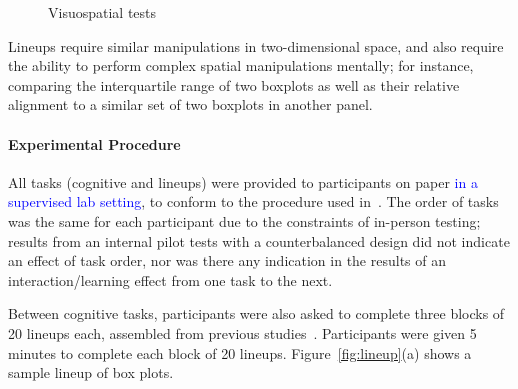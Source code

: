 \documentclass[journal]{vgtc}\usepackage[]{graphicx}\usepackage[]{color}
\newcommand{\newtext}[1]{\textcolor{blue}{#1}}
\begin{document}
\begin{figure}[ht]
  \centering
\hfill
    \hfill
    \caption{Visuospatial tests}
    \label{fig:tests}
\end{figure}

Lineups require similar manipulations in two-dimensional space, and also require the ability to perform complex spatial manipulations mentally; for instance, comparing the interquartile range of two boxplots as well as their relative alignment to a similar set of two boxplots in another panel.

\paragraph{Experimental Procedure}
All tasks (cognitive and lineups) were provided to participants on paper \newtext{in a supervised lab setting}, to conform to the procedure used in~\cite{ekstrom1976manual}. The order of tasks was the same for each participant due to the constraints of in-person testing; results from an internal pilot tests with a counterbalanced design did not indicate an effect of task order, nor was there any indication in the results of an interaction/learning effect from one task to the next.

Between cognitive tasks, participants were also asked to complete three blocks of 20 lineups each, assembled from previous studies~\cite{hofmann2012graphical,majumder2013validation}. Participants were given 5 minutes to complete each block of 20 lineups. Figure~\ref{fig:lineup}(a) shows a sample lineup of box plots. 
\end{document}
